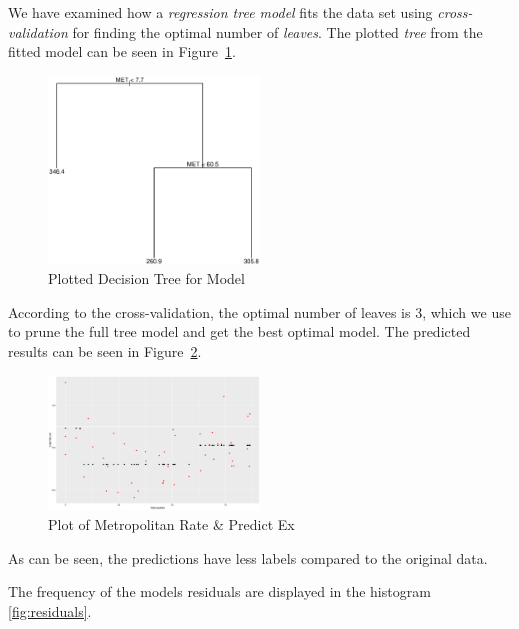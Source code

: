 \documentclass[a4paper, twocolumn]{article}
\begin{document}
        We have examined how a \emph{regression tree model} fits the data set using \emph{cross-validation} for finding the optimal number of \emph{leaves}. The plotted \emph{tree} from the fitted model can be seen in Figure~\ref{fig:tree}.

        \begin{figure}[h!]
            \centering
            \caption{Plotted Decision Tree for Model}
            \label{fig:tree}
            \includegraphics[width=0.5\textwidth]{share/A1_tree.eps}
        \end{figure}

        According to the cross-validation, the optimal number of leaves is 3, which we use to prune the full tree model and get the best optimal model. The predicted results can be seen in Figure~\ref{fig:predicted}.

        \begin{figure}[h!]
            \centering
            \caption{Plot of Metropolitan Rate \& Predict Ex}
            \label{fig:predicted}
            \includegraphics[width=0.5\textwidth]{share/A1_fit.eps}
        \end{figure}

        As can be seen, the predictions have less labels compared to the original data.

        The frequency of the models residuals are displayed in the histogram \ref{fig:residuals}.
\end{document}
